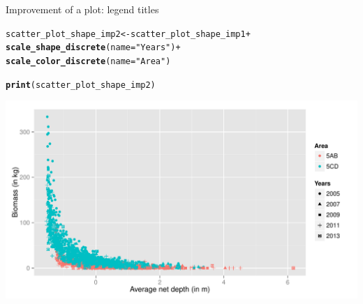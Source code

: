 \documentclass{beamer}\usepackage[]{graphicx}\usepackage[]{color}
\makeatletter
\newcommand{\hlstr}[1]{\textcolor[rgb]{0.192,0.494,0.8}{#1}}%
\newcommand{\hlopt}[1]{\textcolor[rgb]{0,0,0}{#1}}%
\newcommand{\hlstd}[1]{\textcolor[rgb]{0.345,0.345,0.345}{#1}}%
\newcommand{\hlkwb}[1]{\textcolor[rgb]{0.69,0.353,0.396}{#1}}%
\newcommand{\hlkwc}[1]{\textcolor[rgb]{0.333,0.667,0.333}{#1}}%
\newcommand{\hlkwd}[1]{\textcolor[rgb]{0.737,0.353,0.396}{\textbf{#1}}}%
\newenvironment{kframe}{%
 \def\at@end@of@kframe{}%
 \ifinner\ifhmode%
  \def\at@end@of@kframe{\end{minipage}}%
  \begin{minipage}{\columnwidth}%
 \fi\fi%
 \def\FrameCommand##1{\hskip\@totalleftmargin \hskip-\fboxsep
 \colorbox{shadecolor}{##1}\hskip-\fboxsep
     \hskip-\linewidth \hskip-\@totalleftmargin \hskip\columnwidth}%
 \MakeFramed {\advance\hsize-\width
   \@totalleftmargin\z@ \linewidth\hsize
   \@setminipage}}%
 {\par\unskip\endMakeFramed%
 \at@end@of@kframe}
\newenvironment{knitrout}{}{} %
\makeatother
\begin{document}
\begin{frame}[fragile]{Improvement of a plot: legend titles}
\begin{knitrout}\footnotesize
{}\color{fgcolor}\begin{kframe}
\begin{alltt}
  \hlstd{scatter_plot_shape_imp2} \hlkwb{<-} \hlstd{scatter_plot_shape_imp1} \hlopt{+}
  \hlkwd{scale_shape_discrete}\hlstd{(}\hlkwc{name}\hlstd{=}\hlstr{"Years"}\hlstd{)} \hlopt{+}
  \hlkwd{scale_color_discrete}\hlstd{(}\hlkwc{name}\hlstd{=}\hlstr{"Area"}\hlstd{)}

  \hlkwd{print}\hlstd{(scatter_plot_shape_imp2)}
\end{alltt}
\end{kframe}

{\centering \includegraphics[width=.9\linewidth]{figure/scatter_plot_shape_imp2-1} 

}



\end{knitrout}
\end{frame}
\end{document}
